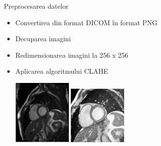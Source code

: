 \documentclass[xcolor=svgnames,handout]{beamer}
\begin{document}
  \begin{frame}
  {Preprocesarea datelor}
  \begin{itemize}
    \item Convertirea din format DICOM \^{i}n format PNG
    \item Decuparea imagini
    \item Redimensionarea imagini la 256 x 256
    \item Aplicarea algoritmului CLAHE
    \vspace{0.5cm}
    \begin{center}
        \includegraphics[width=110]{before.png}
        \hspace{2cm}
        \includegraphics[width=110]{after.png}  
    \end{center}
  \end{itemize}
  \end{frame}
  
\end{document}
